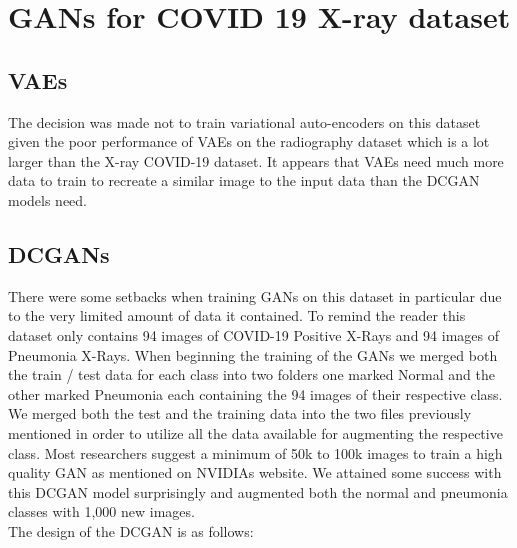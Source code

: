 \section{GANs for COVID 19 X-ray dataset}
\subsection{VAEs}
The decision was made not to train variational auto-encoders on this dataset given the poor performance of VAEs on the radiography dataset which is a lot larger than the X-ray COVID-19 dataset.  It appears that VAEs need much more data to train to recreate a similar image to the input data than the DCGAN models need.
\subsection{DCGANs}
There were some setbacks when training GANs on this dataset in particular due to the very limited amount of data it contained.  To remind the reader this dataset only contains 94 images of COVID-19 Positive X-Rays and 94 images of Pneumonia X-Rays.  When beginning the training of the GANs we merged both the train / test data for each class into two folders one marked Normal and the other marked Pneumonia each containing the 94 images of their respective class.  We merged both the test and the training data into the two files previously mentioned in order to utilize all the data available for augmenting the respective class. Most researchers suggest a minimum of 50k to 100k images to train a high quality GAN as mentioned on NVIDIAs website\cite{nvidiaResearch}. We attained some success with this DCGAN model surprisingly and augmented both the normal and pneumonia classes with 1,000 new images.
\\
The design of the DCGAN is as follows:
